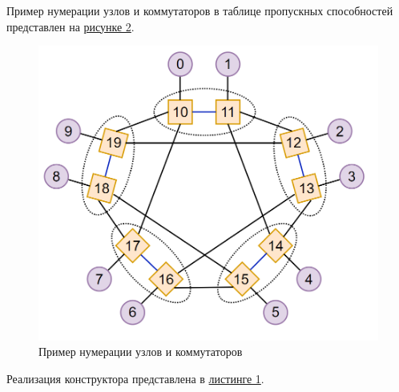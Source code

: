 \documentclass[11pt,a4paper,final]{article} %
\begin{document}
Пример нумерации узлов и коммутаторов в таблице пропускных способностей представлен на \hyperref[fig:pic2]{рисунке 2}.

\begin{figure}[H]
	\centering
	\includegraphics[width=0.7\linewidth]{pic2.png}
	\caption{Пример нумерации узлов и коммутаторов}
	\label{fig:pic2}
\end{figure}

Реализация конструктора представлена в \hyperref[lst1]{листинге 1}.
\end{document}
